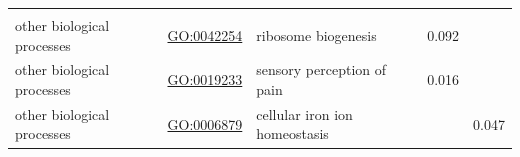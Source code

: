 \documentclass[
]{article}
\begin{document}
\begin{longtable}[]{@{}lllll@{}}
\begin{minipage}[t]{0.17\columnwidth}
\strut
\end{minipage}\tabularnewline
\begin{minipage}[t]{0.17\columnwidth}\raggedright
other biological processes\strut
\end{minipage} & \begin{minipage}[t]{0.17\columnwidth}\raggedright
\url{GO:0042254}\strut
\end{minipage} & \begin{minipage}[t]{0.17\columnwidth}\raggedright
ribosome biogenesis\strut
\end{minipage} & \begin{minipage}[t]{0.17\columnwidth}\raggedright
0.092\strut
\end{minipage} & \begin{minipage}[t]{0.17\columnwidth}\raggedright
\strut
\end{minipage}\tabularnewline
\begin{minipage}[t]{0.17\columnwidth}\raggedright
other biological processes\strut
\end{minipage} & \begin{minipage}[t]{0.17\columnwidth}\raggedright
\url{GO:0019233}\strut
\end{minipage} & \begin{minipage}[t]{0.17\columnwidth}\raggedright
sensory perception of pain\strut
\end{minipage} & \begin{minipage}[t]{0.17\columnwidth}\raggedright
0.016\strut
\end{minipage} & \begin{minipage}[t]{0.17\columnwidth}\raggedright
\strut
\end{minipage}\tabularnewline
\begin{minipage}[t]{0.17\columnwidth}\raggedright
other biological processes\strut
\end{minipage} & \begin{minipage}[t]{0.17\columnwidth}\raggedright
\url{GO:0006879}\strut
\end{minipage} & \begin{minipage}[t]{0.17\columnwidth}\raggedright
cellular iron ion homeostasis\strut
\end{minipage} & \begin{minipage}[t]{0.17\columnwidth}\raggedright
\strut
\end{minipage} & \begin{minipage}[t]{0.17\columnwidth}\raggedright
0.047\strut
\end{minipage}\tabularnewline

\end{longtable}
\end{document}

